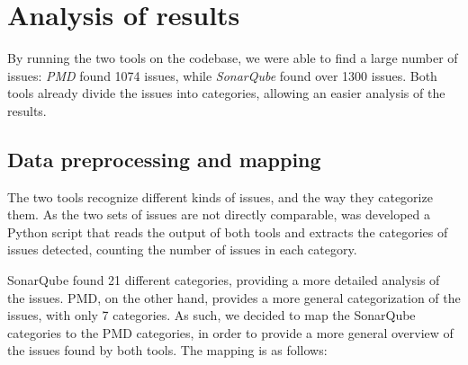 \section{Analysis of results}

By running the two tools on the codebase, we were able to find a large number of issues: \textit{PMD} found 1074 issues, while \textit{SonarQube} found over 1300 issues. Both tools already divide the issues into categories, allowing an easier analysis of the results.

\subsection{Data preprocessing and mapping}
\label{sec:data_preprocessing}

The two tools recognize different kinds of issues, and the way they categorize them. As the two sets of issues are not directly comparable, was developed a Python script that reads the output of both tools and extracts the categories of issues detected, counting the number of issues in each category.

SonarQube found 21 different categories, providing a more detailed analysis of the issues. PMD, on the other hand, provides a more general categorization of the issues, with only 7 categories. As such, we decided to map the SonarQube categories to the PMD categories, in order to provide a more general overview of the issues found by both tools. The mapping is as follows:

